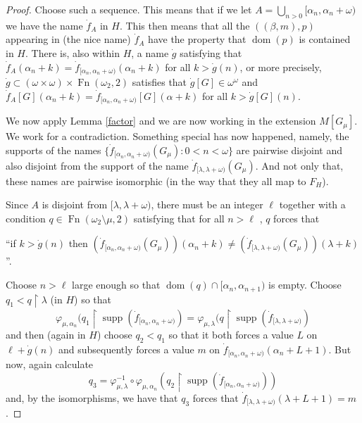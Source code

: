 \documentclass{rmmcart}
\theoremstyle{plain}
\theoremstyle{definition}
\theoremstyle{remark}
\theoremstyle{plain}
\theoremstyle{definition}
\theoremstyle{remark}
\begin{document}
\begin{proof}
            Choose such a sequence.
             This means that if we let $A = \bigcup_{n>0} [\alpha_n,\alpha_n+\omega)$ we
             have the name $\dot f_A$ in $H$. This then means that all
             the $( (\beta,m) , p)$ appearing in (the nice name)
            $\dot f_A$ have the property
             that $\mathop{dom}(p)$ is contained in $H$.
            There is, also within $H$, a name $\dot g$ satisfying that
             $\dot f_A(\alpha_n+k) = \dot f_{[\alpha_n,\alpha_n+\omega)}(\alpha_n+k)$
            for all $k >\dot g(n)$,
            or more precisely,
             $\dot g\subset (\omega\times\omega) \times
             \operatorname{Fn}(\omega_2,2)$ satisfies that
             $\dot g[G]\in \omega^\omega$ and
              $\dot f_{A}[G](\alpha_n+k) = \dot
              f_{[\alpha_n,\alpha_n+\omega)}[G](\alpha+k)$
            for all $k>\dot g[G](n)$.




            We now apply  Lemma \ref{factor} and we are now
            working in the extension $M[G_\mu]$.
            We work for a contradiction. Something special has now happened,
             namely,  the supports of the names $\{
            \dot f_{[\alpha_n, \alpha_n+\omega)} (G_\mu):  0< n<\omega\}$ are pairwise disjoint
            and also disjoint from the support of the name
             $\dot f_{[\lambda,\lambda+\omega)}(G_\mu)$.
             And not only that, these names are pairwise isomorphic (in
             the way that they all map to $F_H$).






             Since $A$ is disjoint from $[\lambda,\lambda+\omega)$,
            there must be an integer $\ell$
            together with a condition
             $q\in \mathop{Fn}(\omega_2\setminus \mu,2)$ satisfying that for all
             $n>\ell$ , $q$ forces that

            \centerline{
             ``if $k>\dot g(n)$ then
             $(\dot f_{[\alpha_n,\alpha_n+\omega)}(G_\mu))(\alpha_n+k) \neq
            (\dot f_{[\lambda,\lambda+\omega)}(G_\mu))(\lambda +k)$''.}

            Choose $n>\ell$ large enough so that $\mathop{dom}(q) \cap [\alpha_n,
            \alpha_{n+1})$ is
            empty.
             Choose $q_1<q\restriction \lambda$ (in $H$) so that
            $$ \varphi_{\mu,\alpha_n}(q_1\restriction \operatorname{supp}(
             \dot f_{[\alpha_n,\alpha_n+\omega)}) =
            \varphi_{\mu,\lambda}(q\restriction \operatorname{supp}(
             \dot f_{[\lambda,\lambda+\omega)}) $$
            and then (again in $H$) choose $q_2 < q_1$
            so that it both forces a value
             $L$ on $\ell+\dot g(n)$
            and subsequently forces a value $m$ on
             $\dot f_{[\alpha_n, \alpha_n+\omega)}(\alpha_n+L+1)$.
            But now, again calculate
            $$ q_3 = \varphi_{\mu,\lambda}^{-1} \circ \varphi_{\mu,\alpha_n}
            (q_2\restriction \operatorname{supp}(\dot
            f_{[\alpha_n,\alpha_n+\omega)}))$$
            and, by the isomorphisms, we have that $q_3$ forces that
             $\dot f_{[\lambda,\lambda+\omega)}(\lambda+L+1) = m$.


\end{proof}
\end{document}
